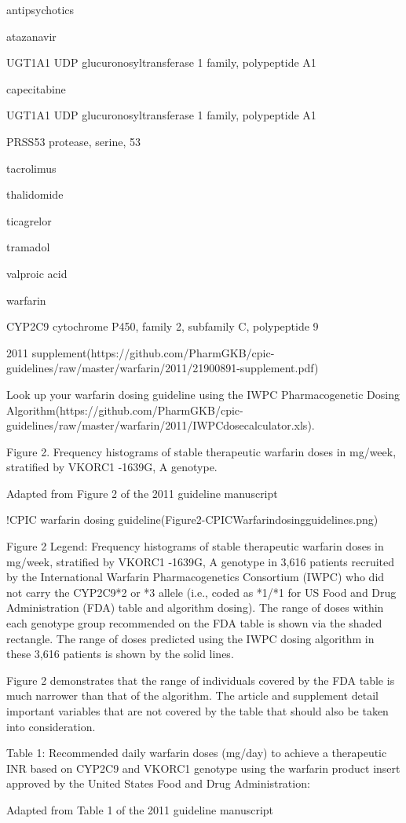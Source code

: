 \documentclass{resume} %
\begin{document}
\begin{rSection}{ antipsychotics }
\begin{rSection}{ atazanavir }
\begin{rSubsection}{ UGT1A1 }{ UDP glucuronosyltransferase 1 family, polypeptide A1 }{}{}
\begin{rSection}{ capecitabine }
\begin{rSubsection}{ UGT1A1 }{ UDP glucuronosyltransferase 1 family, polypeptide A1 }{}{}
\begin{rSubsection}{ PRSS53 }{ protease, serine, 53 }{}{}
\begin{rSection}{ tacrolimus }
\begin{rSection}{ thalidomide }
\begin{rSection}{ ticagrelor }
\begin{rSection}{ tramadol }
\begin{rSection}{ valproic acid }
\begin{rSection}{ warfarin }
\begin{rSubsection}{ CYP2C9 }{ cytochrome P450, family 2, subfamily C, polypeptide 9 }{}{}
\item 2011 supplement(https://github.com/PharmGKB/cpic-guidelines/raw/master/warfarin/2011/21900891-supplement.pdf)
 \newline
\item Look up your warfarin dosing guideline using the IWPC Pharmacogenetic Dosing Algorithm(https://github.com/PharmGKB/cpic-guidelines/raw/master/warfarin/2011/IWPCdosecalculator.xls).
 \newline
\item Figure 2. Frequency histograms of stable therapeutic warfarin doses in mg/week, stratified by VKORC1 -1639G, A genotype.
 \newline
\item Adapted from Figure 2 of the 2011 guideline manuscript
 \newline
\item !CPIC warfarin dosing guideline(Figure2-CPICWarfarindosingguidelines.png)
 \newline
\item Figure 2 Legend: Frequency histograms of stable therapeutic warfarin doses in mg/week, stratified by VKORC1 -1639G, A genotype in 3,616 patients recruited by the International Warfarin Pharmacogenetics Consortium (IWPC) who did not carry the CYP2C9*2 or *3 allele (i.e., coded as *1/*1 for US Food and Drug Administration (FDA) table and algorithm dosing). The range of doses within each genotype group recommended on the FDA table is shown via the shaded rectangle. The range of doses predicted using the IWPC dosing algorithm in these 3,616 patients is shown by the solid lines.
 \newline
\item Figure 2 demonstrates that the range of individuals covered by the FDA table is much narrower than that of the algorithm. The article and supplement detail important variables that are not covered by the table that should also be taken into consideration.
 \newline
\item Table 1: Recommended daily warfarin doses (mg/day) to achieve a therapeutic INR based on CYP2C9 and VKORC1 genotype using the warfarin product insert approved by the United States Food and Drug Administration:
 \newline
\item Adapted from Table 1 of the 2011 guideline manuscript
 \newline

\end{rSubsection}
\end{rSection}
\end{rSection}
\end{rSection}
\end{rSection}
\end{rSection}
\end{rSection}
\end{rSubsection}
\end{rSubsection}
\end{rSection}
\end{rSubsection}
\end{rSection}
\end{rSection}
\end{document}
